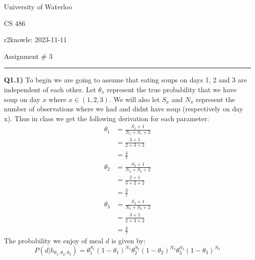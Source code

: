 \documentclass{article}
\begin{document}
\begin{titlepage}
	\setlength{\parindent}{0pt}
	\large

\vspace*{-2cm}



University of Waterloo \par
CS 486 \par
\vspace{0.05cm}
r2knowle: 2023-11-11
\vspace{0.2cm}

{\huge Assignment \# 3 \par}
\hrule

\vspace{0.5cm}
\textbf{Q1.1)} To begin we are going to assume that eating soups on days 1, 2 and 3 are independent of each other. Let $\theta_x$ represent the true probability that we have soup on day $x$ where $x \in (1,2,3)$. We will also let $S_x$ and $N_x$ represent the number of observations where we had and didnt have soup (respectively on day x). Thus in class we get the following derivation for each parameter:
\begin{align*}
\theta_1 &= \frac{S_1 + 1}{N_1 + S_1 + 2} \\
&= \frac{3 + 1}{2 + 3 + 2} \\
&= \frac{4}{7}\\
\theta_2 &= \frac{S_2 + 1}{N_2 + S_2 + 2} \\
&= \frac{2 + 1}{3 + 2 + 2} \\
&= \frac{3}{7}\\
\theta_3 &= \frac{S_3 + 1}{N_3 + S_3 + 2} \\
&= \frac{3 + 1}{2 + 3 + 2} \\
&= \frac{4}{7}
\end{align*}
The probability we enjoy of meal $d$ is given by:
\[P(d|h_{\theta_1, \theta_2, \theta_3}) = \theta_1^{S_1}(1-\theta_1)^{N_1}\theta_2^{S_2}(1-\theta_2)^{N_2}\theta_3^{S_3}(1-\theta_3)^{N_3}\]


\end{titlepage}
\end{document}
